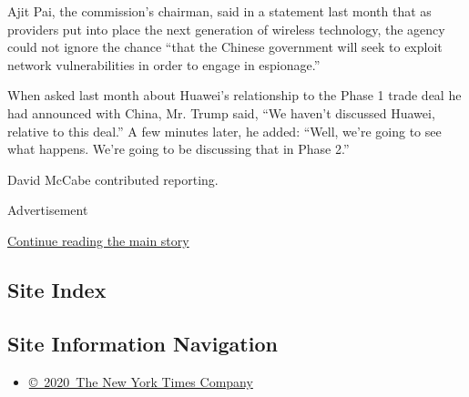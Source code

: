 Ajit Pai, the commission's chairman, said in a statement last month that
as providers put into place the next generation of wireless technology,
the agency could not ignore the chance ``that the Chinese government
will seek to exploit network vulnerabilities in order to engage in
espionage.''

When asked last month about Huawei's relationship to the Phase 1 trade
deal he had announced with China, Mr. Trump said, ``We haven't discussed
Huawei, relative to this deal.'' A few minutes later, he added: ``Well,
we're going to see what happens. We're going to be discussing that in
Phase 2.''

David McCabe contributed reporting.

Advertisement

\protect\hyperlink{after-bottom}{Continue reading the main story}

\hypertarget{site-index}{%
\subsection{Site Index}\label{site-index}}

\hypertarget{site-information-navigation}{%
\subsection{Site Information
Navigation}\label{site-information-navigation}}

\begin{itemize}
\tightlist
\item
  \href{https://help.nytimes3xbfgragh.onion/hc/en-us/articles/115014792127-Copyright-notice}{©~2020~The
  New York Times Company}
\end{itemize}

